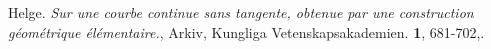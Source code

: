 \documentclass[12pt,a4paper]{article}
\begin{document}
\begin{thebibliography}{99}
   Helge. \emph{Sur une courbe continue sans
      tangente, obtenue par une construction géométrique
      élémentaire.}, Arkiv,
    Kungliga Vetenskapsakademien. \textbf{1}, 681-702,.
\end{thebibliography}
\end{document}
